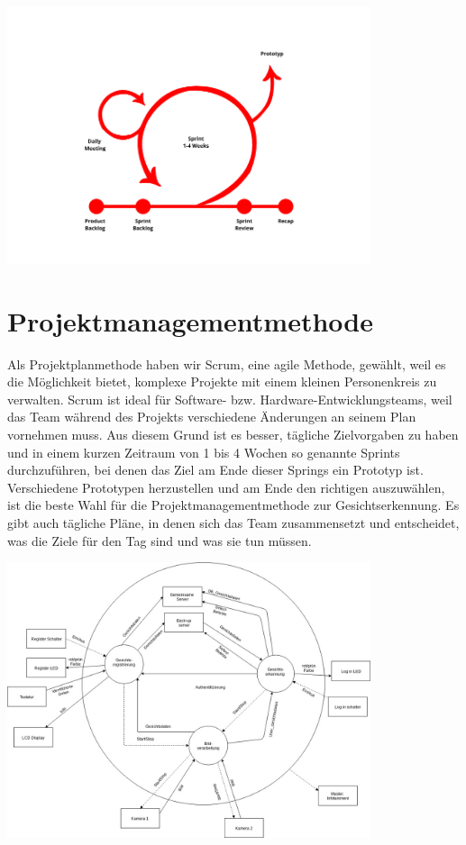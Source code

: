 \includegraphics[width=0.8\textwidth]{./figures/scrum.jpg}

\section{Projektmanagementmethode}
Als Projektplanmethode haben wir Scrum, eine agile Methode, gewählt, weil es die Möglichkeit bietet, komplexe Projekte mit einem kleinen Personenkreis zu verwalten. Scrum ist ideal für Software- bzw. Hardware-Entwicklungsteams, weil das Team während des Projekts verschiedene Änderungen an seinem Plan vornehmen muss. Aus diesem Grund ist es besser, tägliche Zielvorgaben zu haben und in einem kurzen Zeitraum von 1 bis 4 Wochen so genannte Sprints durchzuführen, bei denen das Ziel am Ende dieser Springs ein Prototyp ist. Verschiedene Prototypen herzustellen und am Ende den richtigen auszuwählen, ist die beste Wahl für die Projektmanagementmethode zur Gesichtserkennung. Es gibt auch tägliche Pläne, in denen sich das Team zusammensetzt und entscheidet, was die Ziele für den Tag sind und was sie tun müssen. 


\includegraphics[width=0.8\textwidth]{./figures/Big_Picture.jpg}

